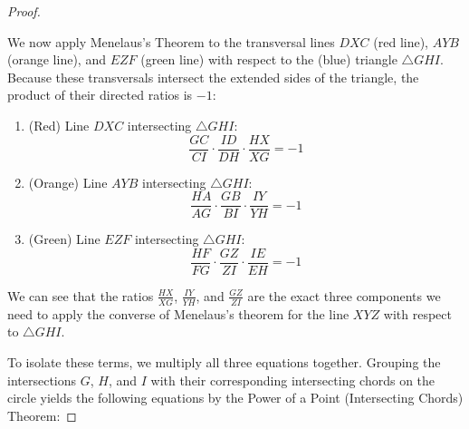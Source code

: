 \documentclass[reqno]{amsart}
\DeclareMathOperator{\1}{\textbf{1}}
\begin{document}
\begin{proof}
\begin{figure}[h]
\begin{center}
            \end{center}        
    \end{figure}

We now apply Menelaus's Theorem to the transversal lines $DXC$ (red line), $AYB$ (orange line), and $EZF$ (green line) with respect to the (blue) triangle $\triangle GHI$. Because these transversals intersect the extended sides of the triangle, the product of their directed ratios is $-1$:

\begin{enumerate}
    \item (Red) Line $DXC$ intersecting $\triangle GHI$:
    \[ \frac{GC}{CI} \cdot \frac{ID}{DH} \cdot \frac{HX}{XG} = -1 \]
    
    \item (Orange) Line $AYB$ intersecting $\triangle GHI$:
    \[ \frac{HA}{AG} \cdot \frac{GB}{BI} \cdot \frac{IY}{YH} = -1 \]
    
    \item (Green) Line $EZF$ intersecting $\triangle GHI$:
    \[ \frac{HF}{FG} \cdot \frac{GZ}{ZI} \cdot \frac{IE}{EH} = -1 \]
\end{enumerate}

We can see that the ratios $\frac{HX}{XG}$, $\frac{IY}{YH}$, and $\frac{GZ}{ZI}$ are the exact three components we need to apply the converse of Menelaus's theorem for the line $XYZ$ with respect to $\triangle GHI$. 

To isolate these terms, we multiply all three equations together. Grouping the intersections $G$, $H$, and $I$ with their corresponding intersecting chords on the circle yields the following equations by the Power of a Point (Intersecting Chords) Theorem:


\end{proof}
\end{document}
